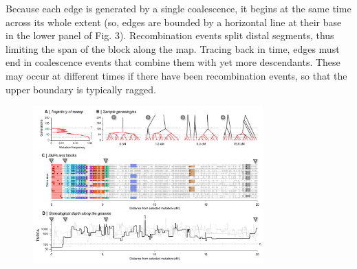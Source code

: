 \documentclass[twocolumn]{bmcart}%
\begin{document}
Because each edge is generated by a single coalescence, it begins at the same time across its whole extent (so, edges are bounded by a horizontal line at their base in the lower panel of Fig. 3). Recombination events split distal segments, thus limiting the span of the block along the map. Tracing back in time, edges must end in coalescence events that combine them with yet more descendants. These may occur at different times if there have been recombination events, so that the upper boundary is typically ragged.

\begin{figure}
    \includegraphics[width=0.79\textwidth]{Fig_4.pdf}

\end{figure}
\end{document}
